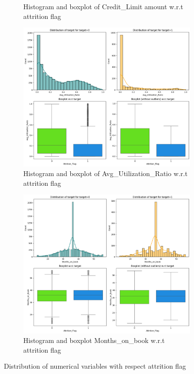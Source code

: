 \documentclass[10pt,a4paper]{style}
\begin{document}
\begin{figure}[h]
\begin{subfigure}[t]{0.47\linewidth}
			\caption{Histogram and boxplot of Credit\_Limit amount w.r.t attrition flag}
			\label{fig:Attrition_Flag vs Credit_Limit}
		\end{subfigure}
		\hfill
		\begin{subfigure}[t]{0.47\linewidth}
			\centering
			\includegraphics[width=\linewidth]{Avg_Utilization_Ratio vs Attrition_Flag.png}
			\caption{Histogram and boxplot of Avg\_Utilization\_Ratio w.r.t attrition flag}
			\label{fig:Avg_Utilization_Ratio vs Attrition_Flag}
		\end{subfigure}
		\hfill
		\begin{subfigure}[t]{0.47\linewidth}
			\centering
			\includegraphics[width=\linewidth]{Attrition_Flag vs Months_on_book.png}
			\caption{Histogram and boxplot  Months\_on\_book w.r.t attrition flag}
			\label{fig:Attrition_Flag vs Months_on_book}
		\end{subfigure}
		\caption{Distribution of numerical variables with respect attrition flag}
		\label{fig: Distribution of further numerical variables with respect attrition flag}
	\end{figure}
	
\end{document}
